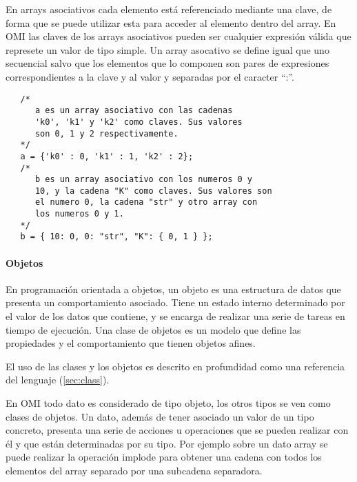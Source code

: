 En arrays asociativos cada elemento está referenciado mediante una clave, de forma que se puede utilizar esta para acceder al elemento dentro del array. En OMI las claves 
de los arrays asociativos pueden ser cualquier expresión válida que represete un valor de tipo simple. Un array asocativo se define igual que uno secuencial salvo que los elementos que lo
componen son pares de expresiones correspondientes a la clave y al valor y separadas por el caracter ``:''. \\

\begin{lstlisting}
   /*
      a es un array asociativo con las cadenas
      'k0', 'k1' y 'k2' como claves. Sus valores 
      son 0, 1 y 2 respectivamente.
   */
   a = {'k0' : 0, 'k1' : 1, 'k2' : 2};
   /* 
      b es un array asociativo con los numeros 0 y
      10, y la cadena "K" como claves. Sus valores son
      el numero 0, la cadena "str" y otro array con 
      los numeros 0 y 1.
   */
   b = { 10: 0, 0: "str", "K": { 0, 1 } }; 
\end{lstlisting}


\paragraph{Objetos} \label{sec:type_object}
En programación orientada a objetos, un objeto es una estructura de datos que presenta un comportamiento asociado. Tiene un estado interno 
determinado por el valor de los datos que contiene, y se encarga de realizar una serie de tareas en tiempo de ejecución. Una clase de objetos es un
modelo que define las propiedades y el comportamiento que tienen objetos afines. 

El uso de las clases y los objetos es descrito en profundidad como una referencia del lenguaje (\autoref{sec:class}).


En OMI todo dato es considerado de tipo objeto, los otros tipos se ven como clases de objetos. Un dato, además de tener asociado un valor de un tipo concreto, 
presenta  una serie de acciones u operaciones que se pueden realizar con él y que están determinadas por su tipo. Por ejemplo sobre un dato array se puede realizar la operación
implode para obtener una cadena con todos los elementos del array separado por una subcadena separadora. \\

